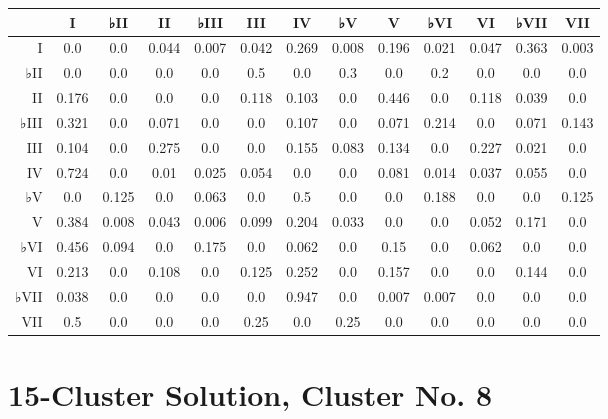 \begin{table}[htbp]
\begin{minipage}{\linewidth}
\setlength{\tymax}{0.5\linewidth}
\centering
\small
\begin{tabulary}{\textwidth}{@{}RCCCCCCCCCCCC@{}} \toprule
&I&♭II&II&♭III&III&IV&♭V&V&♭VI&VI&♭VII&VII\\
\midrule
I&0.0&0.0&0.044&0.007&0.042&0.269&0.008&0.196&0.021&0.047&0.363&0.003\\
♭II&0.0&0.0&0.0&0.0&0.5&0.0&0.3&0.0&0.2&0.0&0.0&0.0\\
II&0.176&0.0&0.0&0.0&0.118&0.103&0.0&0.446&0.0&0.118&0.039&0.0\\
♭III&0.321&0.0&0.071&0.0&0.0&0.107&0.0&0.071&0.214&0.0&0.071&0.143\\
III&0.104&0.0&0.275&0.0&0.0&0.155&0.083&0.134&0.0&0.227&0.021&0.0\\
IV&0.724&0.0&0.01&0.025&0.054&0.0&0.0&0.081&0.014&0.037&0.055&0.0\\
♭V&0.0&0.125&0.0&0.063&0.0&0.5&0.0&0.0&0.188&0.0&0.0&0.125\\
V&0.384&0.008&0.043&0.006&0.099&0.204&0.033&0.0&0.0&0.052&0.171&0.0\\
♭VI&0.456&0.094&0.0&0.175&0.0&0.062&0.0&0.15&0.0&0.062&0.0&0.0\\
VI&0.213&0.0&0.108&0.0&0.125&0.252&0.0&0.157&0.0&0.0&0.144&0.0\\
♭VII&0.038&0.0&0.0&0.0&0.0&0.947&0.0&0.007&0.007&0.0&0.0&0.0\\
VII&0.5&0.0&0.0&0.0&0.25&0.0&0.25&0.0&0.0&0.0&0.0&0.0\\

\bottomrule

\end{tabulary}
\end{minipage}
\end{table}

\section{15-Cluster Solution, Cluster No. 8}
\label{15-clustersolutionclusterno.8}

